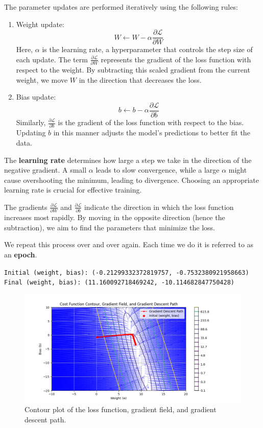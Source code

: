 The parameter updates are performed iteratively using the following rules:
\begin{enumerate}
    \item  Weight update:
    $$W \leftarrow W - \alpha \frac{\partial \mathcal{L}}{\partial W}$$
   Here, $\alpha$ is the learning rate, a hyperparameter that controls the step size of each update. The term $\frac{\partial \mathcal{L}}{\partial W}$ represents the gradient of the loss function with respect to the weight. By subtracting this scaled gradient from the current weight, we move $ W $ in the direction that decreases the loss.

    \item Bias update:
    $$b \leftarrow b - \alpha \frac{\partial \mathcal{L}}{\partial b}$$
    Similarly, $\frac{\partial \mathcal{L}}{\partial b}$ is the gradient of the loss function with respect to the bias. Updating $b$ in this manner adjusts the model's predictions to better fit the data.
\end{enumerate}

The \textbf{learning rate} determines how large a step we take in the direction of the negative gradient. A small $\alpha$ leads to slow convergence, while a large $\alpha$ might cause overshooting the minimum, leading to divergence. Choosing an appropriate learning rate is crucial for effective training.

The gradients $\frac{\partial \mathcal{L}}{\partial W}$ and $\frac{\partial \mathcal{L}}{\partial b}$ indicate the direction in which the loss function increases most rapidly. By moving in the opposite direction (hence the subtraction), we aim to find the parameters that minimize the loss.

We repeat this process over and over again. Each time we do it is referred to as an \textbf{epoch}. 



\texttt{\small{Initial (weight, bias): (-0.21299332372819757, -0.7532380921958663) \\
Final (weight, bias): (11.160092718469242, -10.114682847750428)
}}

\begin{figure}[H]
\centering
\includegraphics[width=330pt]{Regression/code/gradient-field-2.png}
\caption{Contour plot of the loss function, gradient field, and gradient descent path.}
\label{fig:linear4}
\end{figure}

